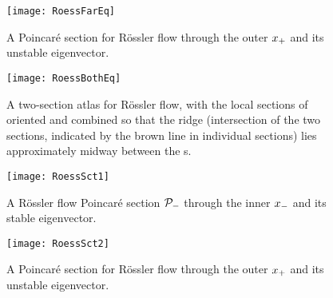 \begin{figure}%
\begin{center}
  \texttt{[image: RoessFarEq]}
\end{center}
  \caption[R\"ossler section, outer {\eqv}]{
  A Poincar\'e section for R\"ossler flow
      through the
      outer
  {\eqv} $x_{+}$  and its unstable eigenvector.
  } \label{fig:RoessFarEq1}
\end{figure}

\begin{figure}%
\begin{center}
  \texttt{[image: RoessBothEq]}
\end{center}
  \caption{
  A two-section atlas for R\"ossler flow, with the local sections of
   oriented and combined so that
  the ridge (intersection of the two sections, indicated by the brown
  line in individual sections) lies  approximately midway between the
  \template s.
  } \label{fig:RoessBothEq1}
\end{figure}

\begin{figure}%
\begin{center}
  \texttt{[image: RoessSct1]}
\end{center}
  \caption{\label{fig:RoessSct1}
  A R\"ossler flow Poincar\'e section ${\cal P}_{-}$ through the inner
  {\eqv} $x_{-}$ and its stable eigenvector.
}
\end{figure}

\begin{figure}%
\begin{center}
  \texttt{[image: RoessSct2]}
\end{center}
  \caption[R\"ossler section, outer {\eqv}]{
  A Poincar\'e section for R\"ossler flow
      through the
      outer
  {\eqv} $x_{+}$  and its unstable eigenvector.
  } \label{fig:RoessSct2}
\end{figure}

